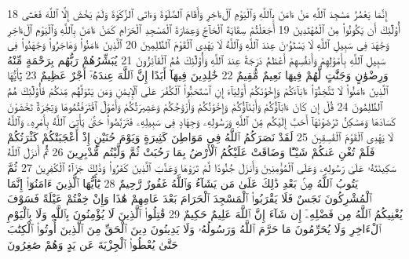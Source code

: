 {\tiny\colorbox{cl_aya}{18}} إِنَّمَا يَعْمُرُ مَسَٰجِدَ ٱللَّهِ مَنْ ءَامَنَ بِٱللَّهِ وَٱلْيَوْمِ ٱلْءَاخِرِ وَأَقَامَ ٱلصَّلَوٰةَ وَءَاتَى ٱلزَّكَوٰةَ وَلَمْ يَخْشَ إِلَّا ٱللَّهَ فَعَسَىٰٓ أُو۟لَٰٓئِكَ أَن يَكُونُوا۟ مِنَ ٱلْمُهْتَدِينَ
{\tiny\colorbox{cl_aya}{19}} أَجَعَلْتُمْ سِقَايَةَ ٱلْحَآجِّ وَعِمَارَةَ ٱلْمَسْجِدِ ٱلْحَرَامِ كَمَنْ ءَامَنَ بِٱللَّهِ وَٱلْيَوْمِ ٱلْءَاخِرِ وَجَٰهَدَ فِى سَبِيلِ ٱللَّهِ لَا يَسْتَوُۥنَ عِندَ ٱللَّهِ وَٱللَّهُ لَا يَهْدِى ٱلْقَوْمَ ٱلظَّٰلِمِينَ
{\tiny\colorbox{cl_aya}{20}} ٱلَّذِينَ ءَامَنُوا۟ وَهَاجَرُوا۟ وَجَٰهَدُوا۟ فِى سَبِيلِ ٱللَّهِ بِأَمْوَٰلِهِمْ وَأَنفُسِهِمْ أَعْظَمُ دَرَجَةً عِندَ ٱللَّهِ وَأُو۟لَٰٓئِكَ هُمُ ٱلْفَآئِزُونَ
{\tiny\colorbox{cl_aya}{21}} يُبَشِّرُهُمْ رَبُّهُم بِرَحْمَةٍ مِّنْهُ وَرِضْوَٰنٍ وَجَنَّٰتٍ لَّهُمْ فِيهَا نَعِيمٌ مُّقِيمٌ
{\tiny\colorbox{cl_aya}{22}} خَٰلِدِينَ فِيهَآ أَبَدًا إِنَّ ٱللَّهَ عِندَهُۥٓ أَجْرٌ عَظِيمٌ
{\tiny\colorbox{cl_aya}{23}} يَٰٓأَيُّهَا ٱلَّذِينَ ءَامَنُوا۟ لَا تَتَّخِذُوٓا۟ ءَابَآءَكُمْ وَإِخْوَٰنَكُمْ أَوْلِيَآءَ إِنِ ٱسْتَحَبُّوا۟ ٱلْكُفْرَ عَلَى ٱلْإِيمَٰنِ وَمَن يَتَوَلَّهُم مِّنكُمْ فَأُو۟لَٰٓئِكَ هُمُ ٱلظَّٰلِمُونَ
{\tiny\colorbox{cl_aya}{24}} قُلْ إِن كَانَ ءَابَآؤُكُمْ وَأَبْنَآؤُكُمْ وَإِخْوَٰنُكُمْ وَأَزْوَٰجُكُمْ وَعَشِيرَتُكُمْ وَأَمْوَٰلٌ ٱقْتَرَفْتُمُوهَا وَتِجَٰرَةٌ تَخْشَوْنَ كَسَادَهَا وَمَسَٰكِنُ تَرْضَوْنَهَآ أَحَبَّ إِلَيْكُم مِّنَ ٱللَّهِ وَرَسُولِهِۦ وَجِهَادٍ فِى سَبِيلِهِۦ فَتَرَبَّصُوا۟ حَتَّىٰ يَأْتِىَ ٱللَّهُ بِأَمْرِهِۦ وَٱللَّهُ لَا يَهْدِى ٱلْقَوْمَ ٱلْفَٰسِقِينَ
{\tiny\colorbox{cl_aya}{25}} لَقَدْ نَصَرَكُمُ ٱللَّهُ فِى مَوَاطِنَ كَثِيرَةٍ وَيَوْمَ حُنَيْنٍ إِذْ أَعْجَبَتْكُمْ كَثْرَتُكُمْ فَلَمْ تُغْنِ عَنكُمْ شَيْـًٔا وَضَاقَتْ عَلَيْكُمُ ٱلْأَرْضُ بِمَا رَحُبَتْ ثُمَّ وَلَّيْتُم مُّدْبِرِينَ
{\tiny\colorbox{cl_aya}{26}} ثُمَّ أَنزَلَ ٱللَّهُ سَكِينَتَهُۥ عَلَىٰ رَسُولِهِۦ وَعَلَى ٱلْمُؤْمِنِينَ وَأَنزَلَ جُنُودًا لَّمْ تَرَوْهَا وَعَذَّبَ ٱلَّذِينَ كَفَرُوا۟ وَذَٰلِكَ جَزَآءُ ٱلْكَٰفِرِينَ
{\tiny\colorbox{cl_aya}{27}} ثُمَّ يَتُوبُ ٱللَّهُ مِنۢ بَعْدِ ذَٰلِكَ عَلَىٰ مَن يَشَآءُ وَٱللَّهُ غَفُورٌ رَّحِيمٌ
{\tiny\colorbox{cl_aya}{28}} يَٰٓأَيُّهَا ٱلَّذِينَ ءَامَنُوٓا۟ إِنَّمَا ٱلْمُشْرِكُونَ نَجَسٌ فَلَا يَقْرَبُوا۟ ٱلْمَسْجِدَ ٱلْحَرَامَ بَعْدَ عَامِهِمْ هَٰذَا وَإِنْ خِفْتُمْ عَيْلَةً فَسَوْفَ يُغْنِيكُمُ ٱللَّهُ مِن فَضْلِهِۦٓ إِن شَآءَ إِنَّ ٱللَّهَ عَلِيمٌ حَكِيمٌ
{\tiny\colorbox{cl_aya}{29}} قَٰتِلُوا۟ ٱلَّذِينَ لَا يُؤْمِنُونَ بِٱللَّهِ وَلَا بِٱلْيَوْمِ ٱلْءَاخِرِ وَلَا يُحَرِّمُونَ مَا حَرَّمَ ٱللَّهُ وَرَسُولُهُۥ وَلَا يَدِينُونَ دِينَ ٱلْحَقِّ مِنَ ٱلَّذِينَ أُوتُوا۟ ٱلْكِتَٰبَ حَتَّىٰ يُعْطُوا۟ ٱلْجِزْيَةَ عَن يَدٍ وَهُمْ صَٰغِرُونَ
